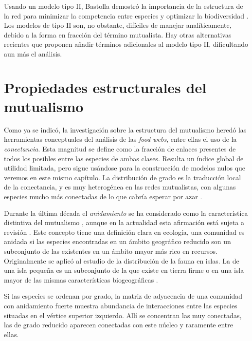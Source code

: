 Usando un modelo tipo II, Bastolla demostró la importancia de la estructura de la red para minimizar la competencia entre especies y optimizar la biodiversidad \cite{bastolla2005,bastolla2009}. Los modelos de tipo II son, no obstante, difíciles de manejar analíticamente, debido a la forma en fracción del término mutualista. Hay otras alternativas recientes \cite{johnson2013} que proponen añadir términos adicionales al modelo tipo II, dificultando aun más el análisis.

\section{Propiedades estructurales del mutualismo}
\label{sec:prop_mutualismo}

Como ya se indicó, la investigación sobre la estructura del mutualismo heredó las herramientas conceptuales del análisis de las \textit{food webs}, entre ellas el uso de la \textit{conectancia}. Esta magnitud se define como la fracción de enlaces presentes de todos los posibles entre las especies de ambas clases. Resulta un índice global de utilidad limitada, pero sigue
usándose para la construcción de modelos nulos que veremos en este mismo capítulo. La distribución de grado es la traducción local de la conectancia, y es muy heterogénea en las redes mutualistas, con algunas especies mucho más conectadas de lo que cabría esperar por azar \cite{jordano2003invariant}.

Durante la última década el \textit{anidamiento} se ha considerado como la característica distintiva del mutualismo \cite{bascompte2003nested}, aunque en la actualidad esta afirmación está sujeta a revisión \cite{james2012disentangling, staniczenko2013ghost, jonhson2013factors, feng2014heterogeneity}. Este concepto tiene una definición clara en ecología, una comunidad es anidada si las especies encontradas en un ámbito geográfico reducido son un subconjunto de las existentes en un ámbito mayor más rico en recursos. Originalmente se aplicó al estudio de la distribución de la fauna en islas. La de una isla pequeña es un subconjunto de la que existe en tierra firme o en una isla mayor de las mismas características biogeográficas \cite{young1958zoogeography, atmar1986nested}.

Si las especies se ordenan por grado, la matriz de adyacencia de una comunidad con anidamiento fuerte muestra abundancia de interacciones entre las especies situadas en el vértice superior izquierdo. Allí se concentran las muy conectadas,
las de grado reducido aparecen conectadas con este núcleo y raramente entre ellas.


